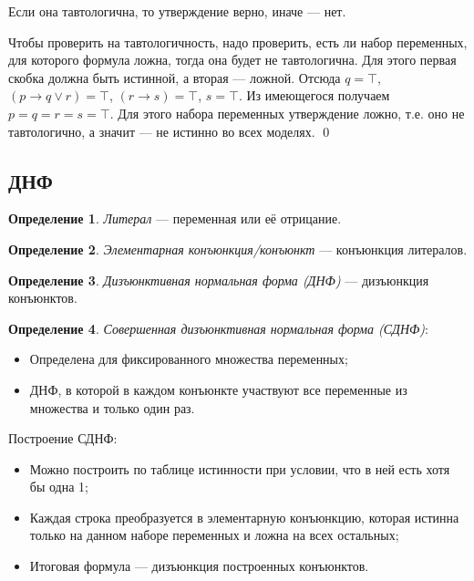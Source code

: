 \documentclass[12pt]{article}
\let\im\rightarrow
\theoremstyle{definition}
\newtheorem{definition}{Определение}[section]
\theoremstyle{statement}
\theoremstyle{theorem}
\begin{document}
Если она тавтологична, то утверждение верно, иначе --- нет.

Чтобы проверить на тавтологичность, надо проверить, есть ли набор
переменных, для которого формула ложна, тогда она будет не
тавтологична. Для этого первая скобка должна быть истинной, а вторая
--- ложной. Отсюда $q = \top$, $(p \im q \lor r) = \top$, $(r \im s)
= \top$, $s = \top$. Из имеющегося получаем $p = q = r = s = \top$.
Для этого набора переменных утверждение ложно, т.е. оно не
тавтологично, а значит --- не истинно во всех моделях. \qed

\subsection{ДНФ}

\begin{definition}
  \textit{Литерал} --- переменная или её отрицание.
\end{definition}

\begin{definition}
  \textit{Элементарная конъюнкция/конъюнкт} --- конъюнкция литералов.
\end{definition}

\begin{definition}
  \textit{Дизъюнктивная нормальная форма (ДНФ)} --- дизъюнкция конъюнктов.
\end{definition}

\begin{definition}
  \textit{Совершенная дизъюнктивная нормальная форма (СДНФ)}:
  \begin{itemize}
    \item Определена для фиксированного множества переменных;

    \item ДНФ, в которой в каждом конъюнкте участвуют все переменные из
      множества и только один раз.
  \end{itemize}
\end{definition}

Построение СДНФ:
\begin{itemize}
  \item Можно построить по таблице истинности при условии, что в ней
    есть хотя бы одна 1;

  \item Каждая строка преобразуется в элементарную конъюнкцию,
    которая истинна только на данном наборе переменных и ложна на
    всех остальных;

  \item Итоговая формула --- дизъюнкция построенных конъюнктов.
\end{itemize}
\end{document}
